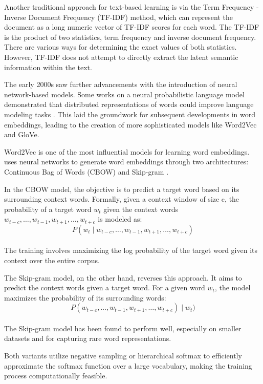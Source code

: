 Another traditional approach for text-based learning is via the Term Frequency - Inverse Document Frequency (TF-IDF) method, which can represent the document as a long numeric vector of TF-IDF scores for each word. The TF-IDF is the product of two statistics, term frequency and inverse document frequency. There are various ways for determining the exact values of both statistics. However, TF-IDF does not attempt to directly extract the latent semantic information within the text.

The early 2000s saw further advancements with the introduction of neural network-based models. Some works on a neural probabilistic language model demonstrated that distributed representations of words could improve language modeling tasks \cite{YoshuaBengioRejeanDucharmePascalVincentChristianJauvin.2003}. This laid the groundwork for subsequent developments in word embeddings, leading to the creation of more sophisticated models like Word2Vec and GloVe.

Word2Vec is one of the most influential models for learning word embeddings. uses neural networks to generate word embeddings through two architectures: Continuous Bag of Words (CBOW) and Skip-gram \cite{Mikolov.16Jan2013}.

In the CBOW model, the objective is to predict a target word based on its surrounding context words. Formally, given a context window of size c, the probability of a target word \(w_{t}\) given the context words \\ \(w_{t-c}, \ldots, w_{t-1}, w_{t+1}, \ldots, w_{t+c}\) is modeled as:\\
\[P(w_t \mid w_{t-c}, \ldots, w_{t-1}, w_{t+1}, \ldots, w_{t+c})\] \\
The training involves maximizing the log probability of the target word given its context over the entire corpus.

The Skip-gram model, on the other hand, reverses this approach. It aims to predict the context words given a target word. For a given word \(w_{t}\), the model maximizes the probability of its surrounding words: \\
\[P(w_{t-c}, \ldots, w_{t-1}, w_{t+1}, \ldots, w_{t+c}) \mid w_t) \] \\
The Skip-gram model has been found to perform well, especially on smaller datasets and for capturing rare word representations. 

Both variants utilize negative sampling or hierarchical softmax to efficiently approximate the softmax function over a large vocabulary, making the training process computationally feasible.


